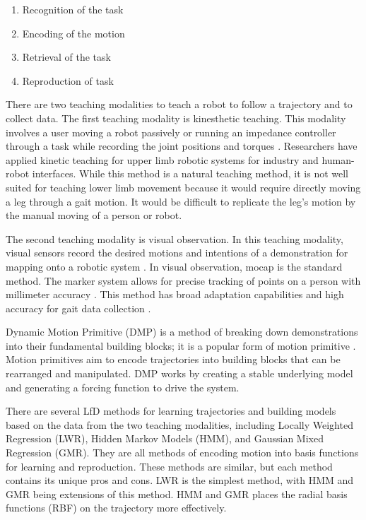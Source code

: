 \begin{enumerate}[noitemsep]
    \item Recognition of the task 
    \item Encoding of the motion 
    \item Retrieval of the task 
    \item Reproduction of task 
\end{enumerate} 

There are two teaching modalities to teach a robot to follow a trajectory and to collect data. The first teaching modality is kinesthetic teaching. This modality involves a user moving a robot passively or running an impedance controller through a task while recording the joint positions and torques \cite{Calinon2018}. Researchers have applied kinetic teaching for upper limb robotic systems for industry and human-robot interfaces. While this method is a natural teaching method, it is not well suited for teaching lower limb movement because it would require directly moving a leg through a gait motion. It would be difficult to replicate the leg's motion by the manual moving of a person or robot. 

The second teaching modality is visual observation. In this teaching modality, visual sensors record the desired motions and intentions of a demonstration for mapping onto a robotic system \cite{CalinonLee19}. In visual observation, mocap is the standard method. The marker system allows for precise tracking of points on a person with millimeter accuracy \cite{ott2008motion}. This method has broad adaptation capabilities and high accuracy for gait data collection \cite{ViconGaiting}.

Dynamic Motion Primitive (DMP) is a method of breaking down demonstrations into their fundamental building blocks; it is a popular form of motion primitive \cite{ijspeert2013dynamical}. Motion primitives aim to encode trajectories into building blocks that can be rearranged and manipulated.  DMP works by creating a stable underlying model and generating a forcing function to drive the system.  

There are several LfD methods for learning trajectories and building models based on the data from the two teaching modalities, including Locally Weighted Regression (LWR), Hidden Markov Models (HMM), and Gaussian Mixed Regression (GMR). They are all methods of encoding motion into basis functions for learning and reproduction. These methods are similar, but each method contains its unique pros and cons. LWR is the simplest method, with HMM and GMR being extensions of this method. HMM and GMR places the radial basis functions (RBF) on the trajectory more effectively.  

